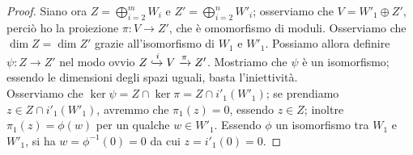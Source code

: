 \documentclass[11pt]{article}
\theoremstyle{plain}
\theoremstyle{definition}
\theoremstyle{remark}
\begin{document}
\begin{proof}
	 Siano ora $Z=\bigoplus_{i=2}^m W_i$ e $Z'=\bigoplus_{i=2}^n W'_i$; osserviamo che $V=W'_1\oplus Z'$, perciò ho la proiezione $\pi:V\to Z'$, che è omomorfismo di moduli. Osserviamo che $\dim Z=\dim Z'$ grazie all'isomorfismo di $W_1$ e $W'_1$.
	 Possiamo allora definire $\psi: Z\to Z'$ nel modo ovvio $Z\xhookrightarrow{i}V\xrightarrow{\pi}Z'$. Mostriamo che $\psi$ è un isomorfismo; essendo le dimensioni degli spazi uguali, basta l'iniettività.\\
	 Osserviamo che $\ker\psi=Z\cap\ker\pi=Z\cap i'_1(W'_1)$; se prendiamo $z\in Z\cap i'_1(W'_1)$, avremmo che $\pi_1(z)=0$, essendo $z\in Z$; inoltre $\pi_1(z)=\phi(w)$ per un qualche $w\in W'_1$. Essendo $\phi$ un isomorfismo tra $W_1$ e $W'_1$, si ha $w=\phi^{-1}(0)=0$ da cui $z=i'_1(0)=0$.
	\end{proof}

	

	
	
	
	
	
	
	
	
	
	
	
	
\end{document}
